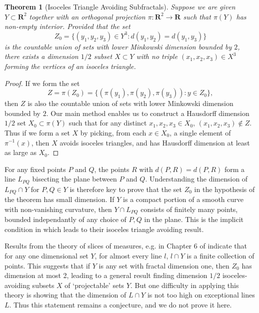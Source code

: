 \documentclass[usenames,dvipsnames]{article}
\theoremstyle{plain}
\theoremstyle{plain}
\newtheorem{theorem}{Theorem}
\begin{document}
\begin{theorem}[Isoceles Triangle Avoiding Subfractals]
	Suppose we are given $Y \subset \mathbf{R}^2$ together with an orthogonal projection $\pi: \mathbf{R}^2 \to \mathbf{R}$ such that $\pi(Y)$ has non-empty interior. Provided that the set
	\[ Z_0 = \{ (y_1,y_2,y_3) \in Y^3 : d(y_1,y_2) = d(y_1,y_3) \} \]
	is the countable union of sets with lower Minkowski dimension bounded by $2$, there exists a dimension $1/2$ subset $X \subset Y$ with no triple $(x_1,x_2,x_3) \in X^3$ forming the vertices of an isoceles triangle.
\end{theorem}
\begin{proof}
	If we form the set
	\[ Z = \pi(Z_0) = \{ (\pi(y_1), \pi(y_2), \pi(y_3)) : y \in Z_0 \}, \]
	then $Z$ is also the countable union of sets with lower Minkowski dimension bounded by $2$. Our main method enables us to construct a Hausdorff dimension $1/2$ set $X_0 \subset \pi(Y)$ such that for any distinct $x_1, x_2, x_3 \in X_0$, $(x_1, x_2, x_3) \not \in Z$. Thus if we form a set $X$ by picking, from each $x \in X_0$, a single element of $\pi^{-1}(x)$, then $X$ avoids isoceles triangles, and has Hausdorff dimension at least as large as $X_0$.
\end{proof}

For any fixed points $P$ and $Q$, the points $R$ with $d(P,R) = d(P,R)$ form a line $L_{PQ}$ bisecting the plane between $P$ and $Q$. Understanding the dimension of $L_{PQ} \cap Y$ for $P,Q \in Y$ is therefore key to prove that the set $Z_0$ in the hypothesis of the theorem has small dimension. If $Y$ is a compact portion of a smooth curve with non-vanishing curvature, then $Y \cap L_{PQ}$ consists of finitely many points, bounded independantly of any choice of $P,Q$ in the plane. This is the implicit condition in \cite{MalabikaRob} which leads to their isoceles triangle avoiding result.

Results from the theory of slices of measures, e.g. in Chapter 6 of \cite{Matilla} indicate that for any one dimensional set $Y$, for almost every line $l$, $l \cap Y$ is a finite collection of points. This suggests that if $Y$ is any set with fractal dimension one, then $Z_0$ has dimension at most 2, leading to a general result finding dimension $1/2$ isoceles-avoiding subsets $X$ of `projectable' sets $Y$. But one difficulty in applying this theory is showing that the dimension of $L \cap Y$ is not too high on exceptional lines $L$. Thus this statement remains a conjecture, and we do not prove it here.
\end{document}
